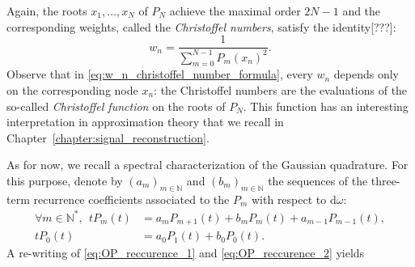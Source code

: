 \documentclass[twoside,11pt]{book}
\begin{document}
Again, the roots $x_{1}, \dots, x_{N}$ of $P_{N}$ achieve the maximal order $2N-1$ and the corresponding weights, 
called the \emph{Christoffel numbers}, satisfy the identity[???]: 
\begin{equation}\label{eq:w_n_christoffel_number_formula}
w_{n} = \frac{1}{\sum\limits_{m =0}^{N-1} P_{m}(x_{n})^{2}}.
\end{equation}
Observe that in \eqref{eq:w_n_christoffel_number_formula}, every $w_{n}$ depends only on the corresponding node $x_{n}$: the Christoffel numbers are the evaluations of  
the so-called \emph{Christoffel function} on the roots of $P_{N}$. This function has an interesting interpretation in approximation theory that we recall in Chapter~\ref{chapter:signal_reconstruction}.



As for now, we recall a spectral characterization of the Gaussian quadrature. 
For this purpose, denote by $(a_{m})_{m \in \mathbb{N}}$ and $(b_{m})_{m \in \mathbb{N}}$ the sequences of the three-term recurrence coefficients associated to the $P_{m}$ with respect to $\mathrm{d}\omega$:
\begin{align}\label{eq:OP_reccurence_1}
\forall m \in \mathbb{N}^{*}, \:\:t P_{m}(t) & = a_{m}P_{m+1}(t) + b_{m}P_{m}(t) + a_{m-1}P_{m-1}(t),\\
\label{eq:OP_reccurence_2}
t P_{0}(t) & = a_{0}P_{1}(t) + b_{0}P_{0}(t) .
\end{align}
A re-writing of \eqref{eq:OP_reccurence_1} and \eqref{eq:OP_reccurence_2} yields 
\end{document}
